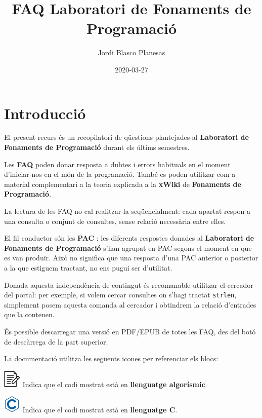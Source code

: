 \documentclass[]{book}
\title{FAQ Laboratori de Fonaments de Programació}
\author{Jordi Blasco Planesas}
\date{2020-03-27}
\begin{document}
\maketitle

{
\setcounter{tocdepth}{1}
\tableofcontents
}
\chapter*{Introducció}\label{introduccio}

El present recurs és un recopilatori de qüestions plantejades al
\textbf{Laboratori de Fonaments de Programació} durant els últims
semestres.

Les \textbf{FAQ} poden donar resposta a dubtes i errors habituals en el
moment d'iniciar-nos en el món de la programació. També es poden
utilitzar com a material complementari a la teoria explicada a la
\textbf{xWiki} de \textbf{Fonaments de Programació}.

La lectura de les FAQ no cal realitzar-la seqüencialment: cada apartat
respon a una consulta o conjunt de consultes, sense relació necessària
entre elles.

El fil conductor són les \textbf{PAC} : les diferents respostes donades
al \textbf{Laboratori de Fonaments de Programació} s'han agrupat en PAC
segons el moment en que es van produïr. Això no significa que una
resposta d'una PAC anterior o posterior a la que estiguem tractant, no
ens pugui ser d'utilitat.

Donada aquesta independència de contingut és recomanable utilitzar el
cercador del portal: per exemple, si volem cercar consultes on s'hagi
tractat \texttt{strlen}, simplement posem aquesta comanda al cercador i
obtindrem la relació d'entrades que la contenen.

És possible descarregar una versió en PDF/EPUB de totes les FAQ, des del
botó de descàrrega de la part superior.

La documentació utilitza les següents icones per referenciar els blocs:

\includegraphics{./img/alg.png} Indica que el codi mostrat està en
\textbf{llenguatge algorísmic}.

\includegraphics{./img/c.png} Indica que el codi mostrat està en
\textbf{llenguatge C}.
\end{document}
